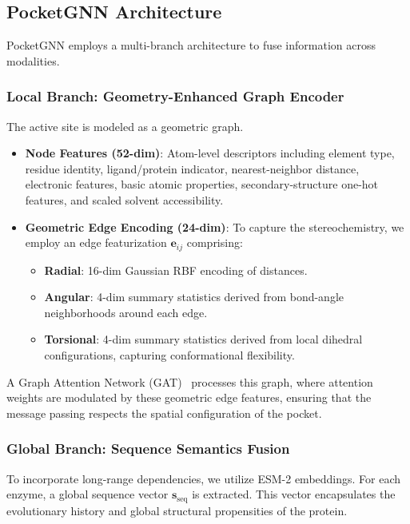 \documentclass[11pt]{article}
\begin{document}
\subsection{PocketGNN Architecture}
\label{sec:model}

PocketGNN employs a multi-branch architecture to fuse information across modalities.

\subsubsection{Local Branch: Geometry-Enhanced Graph Encoder}
The active site is modeled as a geometric graph.
\begin{itemize}
    \item \textbf{Node Features (52-dim)}: Atom-level descriptors including element type, residue identity, ligand/protein indicator, nearest-neighbor distance, electronic features, basic atomic properties, secondary-structure one-hot features, and scaled solvent accessibility.
    \item \textbf{Geometric Edge Encoding (24-dim)}: To capture the stereochemistry, we employ an edge featurization $\mathbf{e}_{ij}$ comprising:
    \begin{itemize}
        \item \textbf{Radial}: 16-dim Gaussian RBF encoding of distances.
        \item \textbf{Angular}: 4-dim summary statistics derived from bond-angle neighborhoods around each edge.
        \item \textbf{Torsional}: 4-dim summary statistics derived from local dihedral configurations, capturing conformational flexibility.
    \end{itemize}
\end{itemize}
A Graph Attention Network (GAT)~\citep{velickovic2018graph} processes this graph, where attention weights are modulated by these geometric edge features, ensuring that the message passing respects the spatial configuration of the pocket.

\subsubsection{Global Branch: Sequence Semantics Fusion}
To incorporate long-range dependencies, we utilize ESM-2 embeddings. For each enzyme, a global sequence vector $\mathbf{s}_{\text{seq}}$ is extracted. This vector encapsulates the evolutionary history and global structural propensities of the protein.
\end{document}

